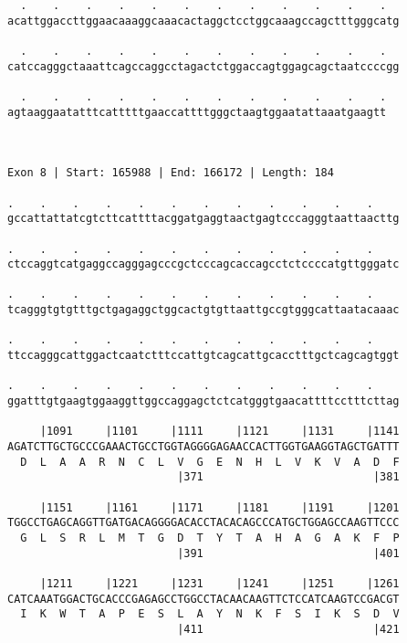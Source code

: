 \documentclass{article}
\begin{document}
\begin{Verbatim}
  .    .    .    .    .    .    .    .    .    .    .    .  
acattggaccttggaacaaaggcaaacactaggctcctggcaaagccagctttgggcatg
                                                            
  .    .    .    .    .    .    .    .    .    .    .    .  
catccagggctaaattcagccaggcctagactctggaccagtggagcagctaatccccgg
                                                            
  .    .    .    .    .    .    .    .    .    .    .    .
agtaaggaatatttcatttttgaaccattttgggctaagtggaatattaaatgaagtt
                                                          
                                                          
 
Exon 8 | Start: 165988 | End: 166172 | Length: 184
 
.    .    .    .    .    .    .    .    .    .    .    .    
gccattattatcgtcttcattttacggatgaggtaactgagtcccagggtaattaacttg
                                                            
.    .    .    .    .    .    .    .    .    .    .    .    
ctccaggtcatgaggccagggagcccgctcccagcaccagcctctccccatgttgggatc
                                                            
.    .    .    .    .    .    .    .    .    .    .    .    
tcagggtgtgtttgctgagaggctggcactgtgttaattgccgtgggcattaatacaaac
                                                            
.    .    .    .    .    .    .    .    .    .    .    .    
ttccagggcattggactcaatctttccattgtcagcattgcacctttgctcagcagtggt
                                                            
.    .    .    .    .    .    .    .    .    .    .    .    
ggatttgtgaagtggaaggttggccaggagctctcatgggtgaacattttcctttcttag
                                                            
     |1091     |1101     |1111     |1121     |1131     |1141
AGATCTTGCTGCCCGAAACTGCCTGGTAGGGGAGAACCACTTGGTGAAGGTAGCTGATTT
  D  L  A  A  R  N  C  L  V  G  E  N  H  L  V  K  V  A  D  F
                          |371                          |381
  
     |1151     |1161     |1171     |1181     |1191     |1201
TGGCCTGAGCAGGTTGATGACAGGGGACACCTACACAGCCCATGCTGGAGCCAAGTTCCC
  G  L  S  R  L  M  T  G  D  T  Y  T  A  H  A  G  A  K  F  P
                          |391                          |401
  
     |1211     |1221     |1231     |1241     |1251     |1261
CATCAAATGGACTGCACCCGAGAGCCTGGCCTACAACAAGTTCTCCATCAAGTCCGACGT
  I  K  W  T  A  P  E  S  L  A  Y  N  K  F  S  I  K  S  D  V
                          |411                          |421
  

\end{Verbatim}
\end{document}
